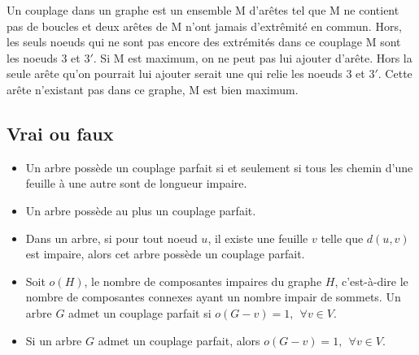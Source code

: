 \begin{figure}[h!]
  \begin{center}
  \end{center}
\end{figure}
\begin{solution}
Un couplage dans un graphe est un ensemble M d’arêtes tel que
M ne contient pas de boucles et deux arêtes de M n’ont jamais
d’extrêmité en commun. Hors, les seuls noeuds qui ne sont pas encore des extrémités dans ce couplage M sont les noeuds $3$ et $3'$. Si M est maximum, on ne peut pas lui ajouter d'arête. Hors la seule arête qu'on pourrait lui ajouter serait une qui relie les noeuds $3$ et $3'$. Cette arête n'existant pas dans ce graphe, M est bien maximum.
\end{solution}

\subsection{Vrai ou faux}

\begin{itemize}
  \item Un arbre possède un couplage parfait si et seulement si tous les chemin d'une feuille à une autre sont de longueur impaire.
  \item Un arbre possède au plus un couplage parfait.
  \item Dans un arbre, si pour tout noeud $u$, il existe une feuille $v$ telle que $d(u,v)$ est impaire, alors cet arbre possède un couplage parfait.
  \item Soit $o(H)$, le nombre de composantes impaires du graphe $H$, c'est-à-dire le nombre de composantes connexes ayant un nombre impair de sommets. Un arbre $G$ admet un couplage parfait si $o(G-v)=1,  \ \ \forall v \in V$.
  \item Si un arbre $G$ admet un couplage parfait, alors $o(G-v)=1, \ \ \forall v \in V$.
\end{itemize}


